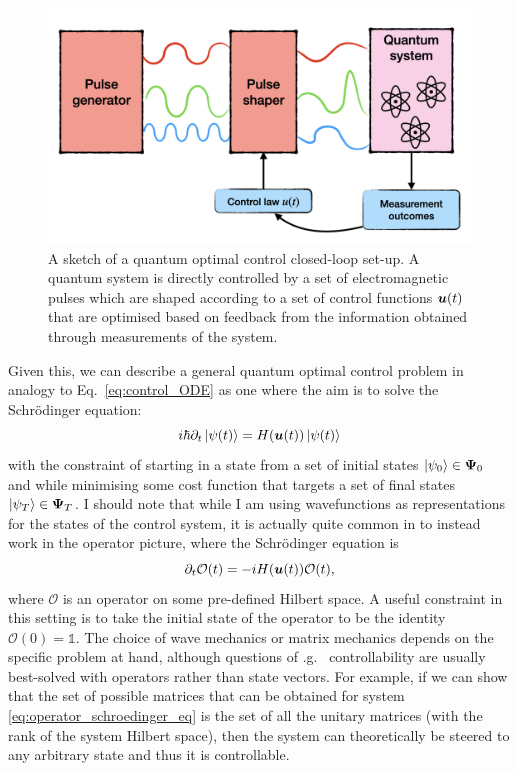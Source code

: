 \begin{figure}[t]
\centering
\includegraphics[width=0.8\linewidth]{images/optimal_control_placeholder.png} \caption[Schematic diagram of open-loop quantum optimal control]{A sketch of a quantum optimal control closed-loop set-up. A quantum system is directly controlled by a set of electromagnetic pulses which are shaped according to a set of control functions $\boldsymbol{u}(t)$ that are optimised based on feedback from the information obtained through measurements of the system.}\label{fig:quantum_optimal_control}
\end{figure}

Given this, we can describe a general quantum optimal control problem in analogy to Eq.~\eqref{eq:control_ODE} as one where the aim is to solve the Schr\"{o}dinger equation:
\begin{equation}\label{eq:optimal_control_schroedinger}
    i \hbar \partial_t \ket{\psi(t)} = H(\boldsymbol{u}(t))\ket{\psi(t)}
\end{equation}
with the constraint of starting in a state from a set of initial states $\ket{\psi_0} \in \boldsymbol \Psi_0$ and while minimising some cost function that targets a set of final states $\ket{\psi_T} \in \boldsymbol \Psi_T$. I should note that while I am using wavefunctions as representations for the states of the control system, it is actually quite common in  to instead work in the operator picture, where the Schr\"{o}dinger equation is
\begin{equation}\label{eq:operator_schroedinger_eq}
    \partial_t \mathcal{O}(t) = -i H(\boldsymbol{u}(t))\mathcal{O}(t),
\end{equation}
where $\mathcal{O}$ is an operator on some pre-defined Hilbert space. A useful constraint in this setting is to take the initial state of the operator to be the identity $\mathcal{O}(0) = \mathds{1}$. The choice of wave mechanics or matrix mechanics depends on the specific  problem at hand, although questions of \@e.g.~ controllability are usually best-solved with operators rather than state vectors. For example, if we can show that the set of possible matrices that can be obtained for system \eqref{eq:operator_schroedinger_eq} is the set of all the unitary matrices (with the rank of the system Hilbert space), then the system can theoretically be steered to any arbitrary state and thus it is controllable.

